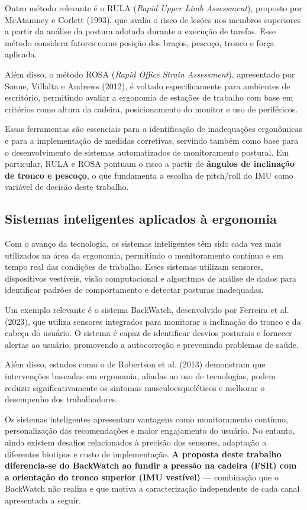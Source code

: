 \documentclass[12pt,a4paper]{article}
\begin{document}
Outro método relevante é o RULA (\emph{Rapid Upper Limb Assessment}), proposto por
McAtamney e Corlett (1993), que avalia o risco de lesões nos membros superiores a
partir da análise da postura adotada durante a execução de tarefas. Esse método
considera fatores como posição dos braços, pescoço, tronco e força aplicada.

Além disso, o método ROSA (\emph{Rapid Office Strain Assessment}), apresentado por
Sonne, Villalta e Andrews (2012), é voltado especificamente para ambientes de escritório,
permitindo avaliar a ergonomia de estações de trabalho com base em critérios como
altura da cadeira, posicionamento do monitor e uso de periféricos.

Essas ferramentas são essenciais para a identificação de inadequações ergonômicas e
para a implementação de medidas corretivas, servindo também como base para o
desenvolvimento de sistemas automatizados de monitoramento postural. Em particular,
RULA e ROSA pontuam o risco a partir de \textbf{ângulos de inclinação de tronco e
pescoço}, o que fundamenta a escolha de pitch/roll do IMU como variável de decisão
deste trabalho.

\subsection{Sistemas inteligentes aplicados à ergonomia}

Com o avanço da tecnologia, os sistemas inteligentes têm sido cada vez mais
utilizados na área da ergonomia, permitindo o monitoramento contínuo e em tempo real
das condições de trabalho. Esses sistemas utilizam sensores, dispositivos
vestíveis, visão computacional e algoritmos de análise de dados para identificar
padrões de comportamento e detectar posturas inadequadas.

Um exemplo relevante é o sistema BackWatch, desenvolvido por Ferreira et al. (2023),
que utiliza sensores integrados para monitorar a inclinação do tronco e da cabeça do
usuário. O sistema é capaz de identificar desvios posturais e fornecer alertas ao
usuário, promovendo a autocorreção e prevenindo problemas de saúde.

Além disso, estudos como o de Robertson et al. (2013) demonstram que intervenções
baseadas em ergonomia, aliadas ao uso de tecnologias, podem reduzir
significativamente os sintomas musculoesqueléticos e melhorar o desempenho dos
trabalhadores.

Os sistemas inteligentes apresentam vantagens como monitoramento contínuo,
personalização das recomendações e maior engajamento do usuário. No entanto, ainda
existem desafios relacionados à precisão dos sensores, adaptação a diferentes
biotipos e custo de implementação. \textbf{A proposta deste trabalho diferencia-se do
BackWatch ao fundir a pressão na cadeira (FSR) com a orientação do tronco superior
(IMU vestível)} --- combinação que o BackWatch não realiza e que motiva a
caracterização independente de cada canal apresentada a seguir.
\end{document}
